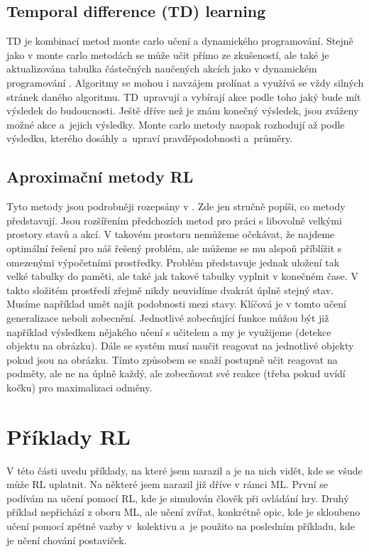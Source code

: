 \documentclass{article}
\begin{document}
\subsection{Temporal difference (TD) learning}
TD je kombinací metod monte carlo učení a dynamického programování. Stejně jako v monte carlo metodách se může učit přímo ze zkušeností, ale také je aktualizována tabulka částečných naučených akcích jako v dynamickém programování \cite{sutton1998introduction}. Algoritmy se mohou i navzájem prolínat a využívá se vždy silných stránek daného algoritmu. TD~upravují a vybírají akce podle toho jaký bude mít výsledek do budoucnosti. Ještě dříve než je znám konečný výsledek, jsou zváženy možné akce a~jejich výsledky. Monte carlo metody naopak rozhodují až podle výsledku, kterého dosáhly a~upraví pravděpodobnosti a~průměry.


\subsection{Aproximační metody RL}

Tyto metody jsou podrobněji rozepsány v \cite{sutton1998introduction}. Zde jen stručně popíši, co metody představují. Jsou rozšířením předchozích metod pro práci s libovolně velkými prostory stavů a akcí. V takovém prostoru nemůžeme očekávat, že najdeme optimální řešení pro náš řešený problém, ale můžeme se mu alspoň příblížit s omezenými výpočetními prostředky. Problém představuje jednak uložení tak velké tabulky do paměti, ale také jak takové tabulky vyplnit v konečném čase. V takto složitém prostředí zřejmě nikdy neuvidíme dvakrát úplně stejný stav. Musíme například umět najít podobnosti mezi stavy. Klíčová je v tomto učení generalizace neboli zobecnění. Jednotlivé zobecňující funkce můžou být již například výsledkem nějakého učení s učitelem a my je využijeme (detekce objektu na obrázku). Dále se systém musí naučit reagovat na jednotlivé objekty pokud jsou na obrázku. Tímto způsobem se snaží postupně učit reagovat na podměty, ale ne na úplně každý, ale zobecňovat své reakce (třeba pokud uvídí kočku) pro maximalizaci odměny. 


\section{Příklady RL}
\label{sec:priklady}
V této části uvedu příklady, na které jsem narazil a je na nich vidět, kde se všude může RL uplatnit. Na některé jsem narazil již dříve v rámci ML. První se podívám na učení pomocí RL, kde je simulován člověk při ovládání hry. Druhý příklad nepřichází z oboru ML, ale učení zvířat, konkrétně opic, kde je skloubeno učení pomocí zpětné vazby v~kolektivu a~je použito na posledním příkladu, kde je učení chování postaviček. 
\end{document}

